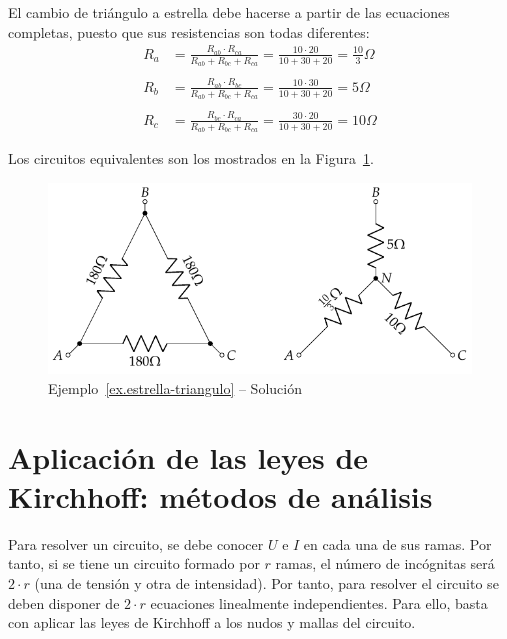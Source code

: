 \documentclass[11pt]{book} %
\begin{document}
\begin{example}
El cambio de triángulo a estrella debe hacerse a partir de las ecuaciones completas, puesto que sus resistencias son todas diferentes: 
\begin{align*}
			R_a &= \frac{R_{ab} \cdot R_{ca}}{R_{ab} + R_{bc} + R_{ca}}=\frac{10 \cdot 20}{10 + 30 + 20}=\frac{10}{3}\Omega\\
			\\
			R_b &= \frac{R_{ab} \cdot R_{bc}}{R_{ab} + R_{bc} + R_{ca}}=\frac{10 \cdot 30}{10+30+20}=5\Omega\\
			\\
			R_c &= \frac{R_{bc} \cdot R_{ca}}{R_{ab} + R_{bc} + R_{ca}}=\frac{30 \cdot 20}{10+30+20}=10\Omega
		\end{align*}

Los circuitos equivalentes son los mostrados en la Figura~\ref{fig.ejercicio7-bt1-sol}.
 \begin{figure}[H]
 		\centering
\includegraphics{../figs/ej7_BT1_sol.pdf}%
 		\caption{Ejemplo~\ref{ex.estrella-triangulo} -- Solución}
 		\label{fig.ejercicio7-bt1-sol}
 	\end{figure}
	    
	\end{example}
	
	\section{Aplicación de las leyes de Kirchhoff: métodos de análisis} \label{sec.metodos_analisis_cc}
	Para resolver un circuito, se debe conocer $U$ e $I$ en cada una de sus ramas. Por tanto, si se tiene un circuito formado por $r$ ramas, el número de incógnitas será $2\cdot r$ (una de tensión y otra de intensidad). Por tanto, para resolver el circuito se deben disponer de $2\cdot r$ ecuaciones linealmente independientes. Para ello, basta con aplicar las leyes de Kirchhoff a los nudos y mallas del circuito. 
	
\end{document}
